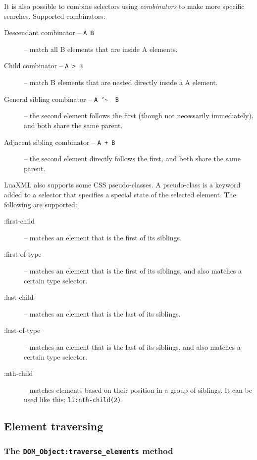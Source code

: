 \documentclass{ltxdoc}
\begin{document}
\bigskip
\noindent It is also possible to combine selectors using \textit{combinators} to make more specific searches. Supported combinators:

\begin{description}
  \item[Descendant combinator -- \texttt{A B}] -- match all B elements that are inside A elements.
  \item[Child combinator -- \verb|A > B|] -- match B elements that are nested directly inside a A element.
  \item[General sibling combinator -- \texttt{A \char`\~ ~B}] -- the second element
    follows the first (though not necessarily immediately), and both share the
    same parent.
  \item[Adjacent sibling combinator -- \texttt{A + B}] --  the second element directly follows the first, and both share the same parent.
\end{description}

\bigskip
\noindent LuaXML also supports some CSS pseudo-classes. A pseudo-class is a
keyword added to a selector that specifies a special state of the selected
element. The following are supported:

\begin{description}
  \item[:first-child] -- matches an element that is the first of its siblings.
  \item[:first-of-type] -- matches an element that is the first of its siblings, 
    and also matches a certain type selector.
  \item[:last-child] -- matches an element that is the last of its siblings.
  \item[:last-of-type] -- matches an element that is the last of its siblings,
    and also matches a certain type selector.
  \item[:nth-child] -- matches elements based on their position in a group of siblings.
    It can be used like this: \verb|li:nth-child(2)|.
\end{description}




\subsection{Element traversing}

\subsubsection{The \texttt{DOM\_Object:traverse\_elements} method}
\end{document}
